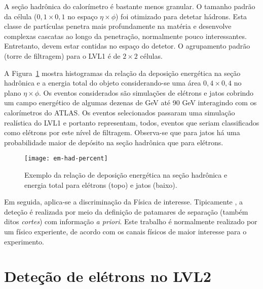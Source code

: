 A seção hadrônica do calorímetro é bastante menos granular. O tamanho padrão
da célula ($0,1\times0,1$ no espaço $\eta\times\phi$) foi otimizado para
detetar hádrons. Esta classe de partículas penetra mais profundamente na
matéria e desenvolve complexas cascatas ao longo da penetração, normalmente
pouco interessantes. Entretanto, devem estar contidas no espaço do detetor. O
agrupamento padrão (torre de filtragem) para o LVL1 é de $2\times2$ células.

A Figura~\ref{fig:e-jet-deposit} mostra histogramas da relação da deposição
energética na seção hadrônica e a energia total do objeto considerando-se uma
área $0,4\times0,4$ no plano $\eta\times\phi$. Os eventos considerados são
simulações de elétrons e jatos cobrindo um campo energético de algumas dezenas
de GeV até 90 GeV interagindo com os calorímetros do ATLAS. Os eventos
selecionados passaram uma simulação realística do LVL1 e portanto representam,
todos, eventos que seriam classificados como elétrons por este nível de
filtragem. Observa-se que para jatos há uma probabilidade maior de depósito na
seção hadrônica que para elétrons.

\begin{figure}
\begin{center}
\texttt{[image: em-had-percent]}
\end{center}
\caption{Exemplo da relação de deposição energética na seção hadrônica e
energia total para elétrons (topo) e jatos (baixo).}
\label{fig:e-jet-deposit}
\end{figure}

Em seguida, aplica-se a discriminação da Física de interesse. Tipicamente
\cite{nevski-calor-1992, guida-calor-1992, palutan-calor-2000}, a deteção é
realizada por meio da definição de patamares de separação (também ditos
\emph{cortes}) com informação \emph{a priori}. Este trabalho é normalmente
realizado por um físico experiente, de acordo com os canais físicos de maior
interesse para o experimento.


\section{Deteção de elétrons no LVL2}
\label{sec:lvl2-detect-electron}

